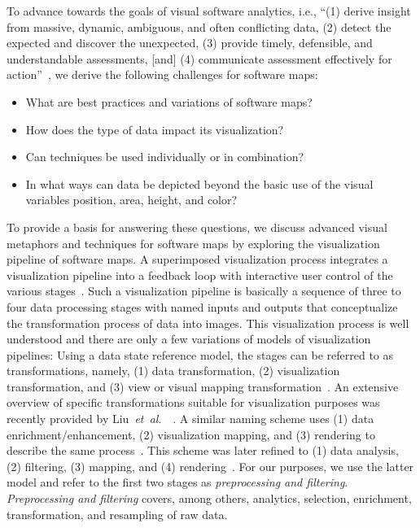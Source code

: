 \documentclass[sigconf]{acmart}
\def\etal{\textit{et~al}.~}
\def\ie{i.e., }
\begin{document}
\par
To advance towards the goals of visual software analytics, \ie \enquote{(1) derive insight from massive, dynamic, ambiguous, and often conflicting data, (2) detect the expected and discover the unexpected, (3) provide timely, defensible, and understandable assessments, [and] (4) communicate assessment effectively for action}~\cite{keim2008-visual}, we derive the following challenges for software maps:
\begin{itemize}
	\item What are best practices and variations of software maps?
	\item How does the type of data impact its visualization?
	\item Can techniques be used individually or in combination?
	\item In what ways can data be depicted beyond the basic use of the visual variables position, area, height, and color?
\end{itemize}
\par
To provide a basis for answering these questions, we discuss advanced visual metaphors and techniques for software maps by exploring the visualization pipeline of software maps.
A superimposed visualization process integrates a visualization pipeline into a feedback loop with interactive user control of the various stages~\cite{wijk2005-visualization}.
Such a visualization pipeline is basically a sequence of three to four data processing stages with named inputs and outputs that conceptualize the transformation process of data into images.
This visualization process is well understood and there are only a few variations of models of visualization pipelines:
Using a data state reference model, the stages can be referred to as transformations, namely, (1) data transformation, (2) visualization transformation, and (3) view or visual mapping transformation~\cite{chi1998-operator,card1999-readings,chi2000-taxonomy}.
An extensive overview of specific transformations suitable for visualization purposes was recently provided by Liu~\etal~\cite{liu2017-advances}.
A similar naming scheme uses (1) data enrichment/enhancement, (2) visualization mapping, and (3) rendering to describe the same process~\cite{haber1990-visualization}.
This scheme was later refined to (1) data analysis, (2) filtering, (3) mapping, and (4) rendering~\cite{santos2004-gaining}.
For our purposes, we use the latter model and refer to the first two stages as \emph{preprocessing and filtering}.
\emph{Preprocessing and filtering} covers, among others, analytics, selection, enrichment, transformation, and resampling of raw data.
\end{document}
